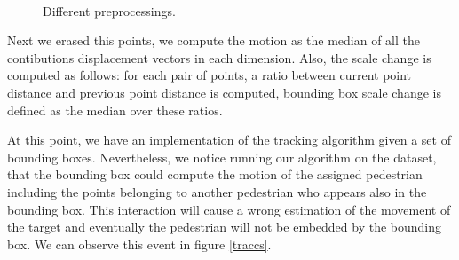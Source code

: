 \documentclass[12pt, a4paper, titlepage,twoside,openright]{article}
\begin{document}
\begin{figure}[H]
		
\centering

\\
\caption{Different preprocessings.}
\label{motion3}
\end{figure}


Next we erased this points, we compute the motion as the median of all the contibutions displacement vectors in each dimension. Also, the scale change is computed as follows: for each pair of points, a ratio between current point distance and previous point distance is computed, bounding box scale change is defined as the median over these ratios. 

At this point, we have an implementation of the tracking algorithm given a set of bounding boxes. Nevertheless, we notice running our algorithm on the dataset, that the bounding box could compute the motion of the assigned pedestrian including the points belonging to another pedestrian who appears also in the bounding box. This interaction will cause a wrong estimation of the movement of the target and eventually the pedestrian will not be embedded by the bounding box. We can observe this event in figure \ref{traccs}.
\end{document}
